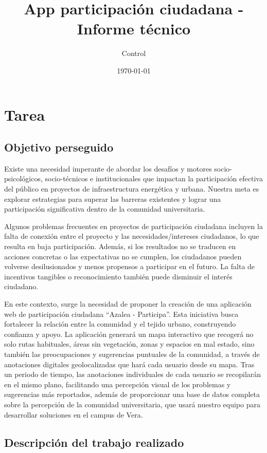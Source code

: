 \documentclass{article}
\title{App participación ciudadana - Informe técnico}
\author{Control}
\date{\today}
\begin{document}
 


\tableofcontents

\newpage

\section{Tarea}

\subsection{Objetivo perseguido}
Existe una necesidad imperante de abordar los desafíos y motores socio-psicológicos, socio-técnicos e institucionales que impactan la participación efectiva del público en proyectos de infraestructura energética y urbana. Nuestra meta es explorar estrategias para superar las barreras existentes y lograr una participación significativa dentro de la comunidad universitaria. 

Algunos problemas frecuentes en proyectos de participación ciudadana incluyen la falta de conexión entre el proyecto y las necesidades/intereses ciudadanos, lo que resulta en baja participación. Además, si los resultados no se traducen en acciones concretas o las expectativas no se cumplen, los ciudadanos pueden volverse desilusionados y menos propensos a participar en el futuro. La falta de incentivos tangibles o reconocimiento también puede disminuir el interés ciudadano.

En este contexto, surge la necesidad de proponer la creación de una aplicación web de participación ciudadana ``Azalea - Participa''. Esta iniciativa busca fortalecer la relación entre la comunidad y el tejido urbano, construyendo confianza y apoyo. La aplicación generará un mapa interactivo que recogerá no solo rutas habituales, áreas sin vegetación, zonas y espacios en mal estado, sino también las preocupaciones y sugerencias puntuales de la comunidad, a través de anotaciones digitales geolocalizadas que hará cada usuario desde su mapa. Tras un periodo de tiempo, las anotaciones individuales de cada usuario se recopilarán en el mismo plano, facilitando una percepción visual de los problemas y sugerencias más reportados, además de proporcionar una base de datos completa sobre la percepción de la comunidad universitaria, que usará nuestro equipo para desarrollar soluciones en el campus de Vera.

\subsection{Descripción del trabajo realizado}
\end{document}
